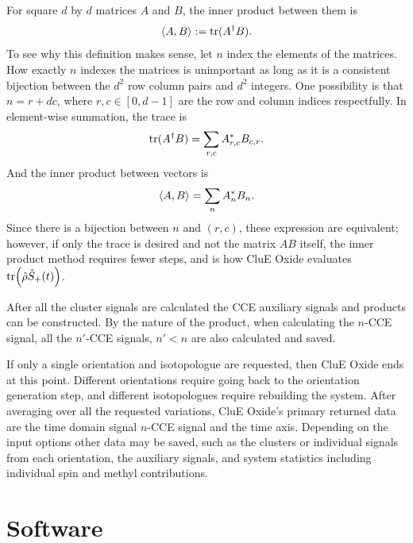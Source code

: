 \documentclass{book}
\begin{document}
For square $d$ by $d$ matrices $A$ and $B$, the inner product between them is
%
\begin{equation}
\braket{A,B} := \text{tr}(A^\dagger B).
\end{equation}
%
To see why this definition makes sense, let $n$ index the elements of the
matrices.  How exactly $n$ indexes the matrices is unimportant as long as it is 
a consistent bijection between the $d^2$ row column pairs and $d^2$ integers.
One possibility is that $n = r + dc$, where $r,c\in [0,d-1]$ 
are the row and column indices respectfully.  In element-wise summation, the
trace is
%
\begin{equation}
\text{tr}(A^\dagger B) = \sum_{r,c} A_{r,c}^{*}B_{c,r}
.
\end{equation}
%
And the inner product between vectors is 
%
\begin{equation}
\braket{A,B} = \sum_{n} A_{n}^{*}B_{n}
.
\end{equation}
%
Since there is a bijection between $n$ and $(r,c)$, 
these expression are equivalent; however, if only the trace is desired and not
the matrix $AB$ itself, the inner product method requires fewer steps, 
and is how CluE Oxide evaluates $\text{tr}\Big(\hat{\rho} \hat{S}_{+}(t)\Big)$.

After all the cluster signals are calculated the CCE auxiliary signals and 
products can be constructed.  By the nature of the product, when calculating 
the $n$-CCE signal, all the $n'$-CCE signals, $n'<n$ are also calculated and 
saved.

If only a single orientation and isotopologue are requested, 
then CluE Oxide ends at this point.  
Different orientations require going back to the orientation
generation step, and different isotopologues require rebuilding the system.
After averaging over all the requested variations, 
CluE Oxide's primary returned data are
the time domain signal $n$-CCE signal and the time axis.  Depending on the 
input options other data may be saved, such as the clusters or 
individual signals from each orientation, the auxiliary signals, 
and system statistics including individual spin and methyl contributions.  
\section{Software}

\end{document}
